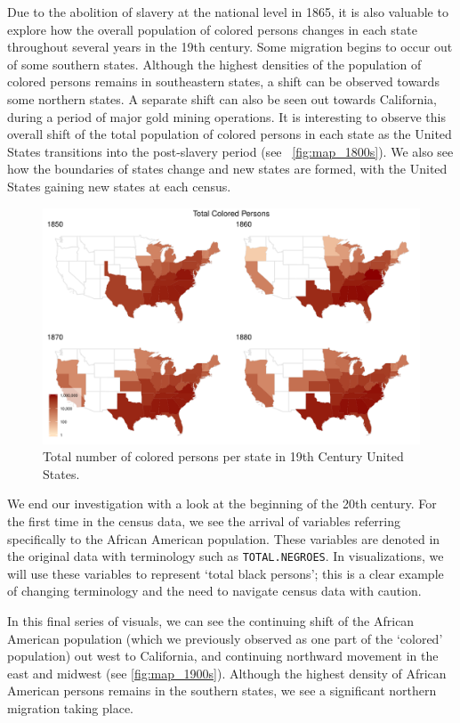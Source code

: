 \documentclass[DIV=calc, paper=a4, fontsize=10pt, twocolumn]{scrartcl}\usepackage[]{graphicx}\usepackage[]{color}
\newenvironment{knitrout}{}{} %
\begin{document}
\par Due to the abolition of slavery at the national level in 1865, it is also valuable to explore how the overall population of colored persons changes in each state throughout several years in the 19th century. Some migration begins to occur out of some southern states. Although the highest densities of the population of colored persons remains in southeastern states, a shift can be observed towards some northern states. A separate shift can also be seen out towards California, during a period of major gold mining operations. It is interesting to observe this overall shift of the total population of colored persons in each state as the United States transitions into the post-slavery period (see ~\autoref{fig:map_1800s}). We also see how the boundaries of states change and new states are formed, with the United States gaining new states at each census.  

\begin{knitrout}
\color{fgcolor}\begin{figure}[h]
\includegraphics[width=.5\textwidth]{figure/map_1800s-1} \caption[Total number of colored persons per state in 19th Century United States]{Total number of colored persons per state in 19th Century United States.}\label{fig:map_1800s}
\end{figure}


\end{knitrout}

\par We end our investigation with a look at the beginning of the 20th century. For the first time in the census data, we see the arrival of variables referring specifically to the African American population. These variables are denoted in the original data with terminology such as \texttt{TOTAL.NEGROES}. In visualizations, we will use these variables to represent `total black persons'; this is a clear example of changing terminology and the need to navigate census data with caution. 

\par In this final series of visuals, we can see the continuing shift of the African American population (which we previously observed as one part of the `colored' population) out west to California, and continuing northward movement in the east and midwest (see \autoref{fig:map_1900s}). Although the highest density of African American persons remains in the southern states, we see a significant northern migration taking place. 
\end{document}
